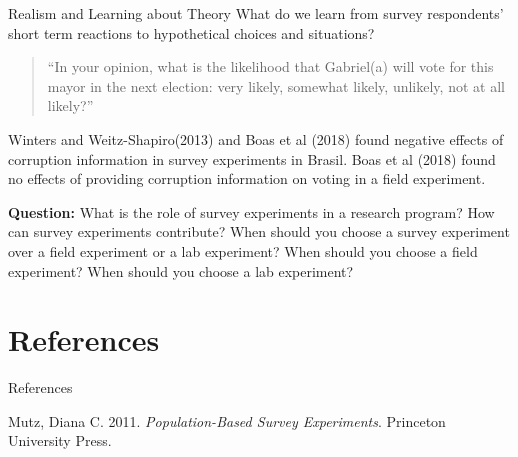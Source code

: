 \documentclass[
  ignorenonframetext,
]{beamer}
\newlength{\cslhangindent}
\newlength{\cslentryspacingunit} %
\newenvironment{CSLReferences}[2] %
 {%
  \setlength{\parindent}{0pt}
  \ifodd #1
  \let\oldpar\par
  \def\par{\hangindent=\cslhangindent\oldpar}
  \fi
  \setlength{\parskip}{#2\cslentryspacingunit}
 }%
 {}
\begin{document}
\begin{frame}{Realism and Learning about Theory}
\protect\hypertarget{realism-and-learning-about-theory}{}
What do we learn from survey respondents' short term reactions to
hypothetical choices and situations?

\begin{quote}
``In your opinion, what is the likelihood that Gabriel(a) will vote for
this mayor in the next election: very likely, somewhat likely, unlikely,
not at all likely?''
\end{quote}

Winters and Weitz-Shapiro(2013) and Boas et al (2018) found negative
effects of corruption information in survey experiments in Brasil. Boas
et al (2018) found no effects of providing corruption information on
voting in a field experiment.

\medskip

\textbf{Question:} What is the role of survey experiments in a research
program? How can survey experiments contribute? When should you choose a
survey experiment over a field experiment or a lab experiment? When
should you choose a field experiment? When should you choose a lab
experiment?
\end{frame}

\hypertarget{references}{%
\section*{References}\label{references}}

\begin{frame}{References}
\hypertarget{refs}{}
\begin{CSLReferences}{1}{0}
\leavevmode{}%
Mutz, Diana C. 2011. \emph{Population-Based Survey Experiments}.
Princeton University Press.

\end{CSLReferences}
\end{frame}
\end{document}
